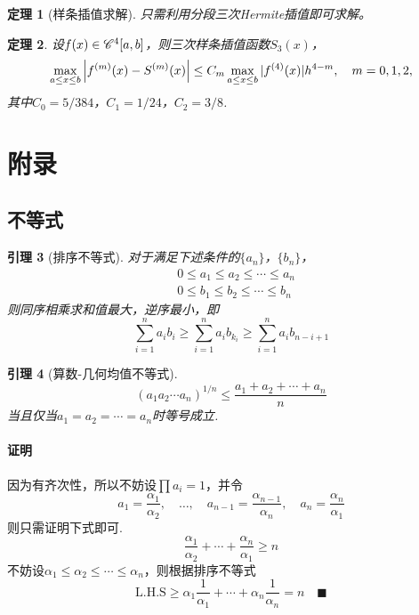 \documentclass[12pt, a4paper]{article}
\theoremstyle{margin}
\newtheorem{thm}{定理}
\newtheorem{lemma}[thm]{引理}
\newcommand{\ms}{\mathscr}
\newcommand{\f}{\mathnormal{f}}
\newcommand{\lhs}{\text{L.H.S}}
\newcommand{\proof}{\paragraph{证明}}
\begin{document}
  \begin{thm}[样条插值求解]
    只需利用分段三次Hermite插值即可求解。
  \end{thm}

  \begin{thm}
    设$\f(x)\in\ms{C}^4[a, b]$，则三次样条插值函数$S_3(x)$，
    \[
      \max_{a\le x\le b}\left| \f^{(m)}(x) - S^{(m)}(x) \right|
      \le C_m \max_{a\le x\le b}|\f^{(4)}(x)|h^{4-m},\quad
      m=0,1,2,
    \]
    其中$C_0 = 5/384$，$C_1 = 1/24$，$C_2 = 3/8$.
  \end{thm}


\newpage
\section{附录}
\subsection{不等式}

  \begin{lemma}[排序不等式]
    \label{lemma: 排序不等式}
    对于满足下述条件的$\{a_n\}$，$\{b_n\}$，
    \[\begin{split}
      & 0 \le a_1\le a_2\le\cdots\le a_n \\
      & 0 \le b_1\le b_2\le\cdots\le b_n
    \end{split}\]
    则同序相乘求和值最大，逆序最小，即
    \[
      \sum_{i=1}^n a_ib_i \ge \sum_{i=1}^n a_ib_{k_i}
      \ge \sum_{i=1}^n a_ib_{n-i+1}
    \]
  \end{lemma}

  \begin{lemma}[算数-几何均值不等式]
    \[
      (a_1a_2\cdots a_n)^{1/n} \le \frac{a_1+a_2+\cdots+a_n}{n}
    \]
    当且仅当$a_1 = a_2 = \cdots = a_n$时等号成立.
  \end{lemma}
  \proof
    因为有齐次性，所以不妨设$\prod a_i=1$，并令
    \[
      a_1=\frac{\alpha_1}{\alpha_2},\quad
      \dots,\quad
      a_{n-1} = \frac{\alpha_{n-1}}{\alpha_n},\quad
      a_n = \frac{\alpha_n}{\alpha_1}
    \]
    则只需证明下式即可.
    \[
      \frac{\alpha_1}{\alpha_2} + \cdots + \frac{\alpha_n}{\alpha_1}
      \ge n
    \]
    不妨设$\alpha_1 \le \alpha_2 \le \cdots \le \alpha_n$，则根据排序不等式
    \[
      \lhs \ge \alpha_1\frac{1}{\alpha_1} + \cdots + \alpha_n\frac{1}{\alpha_n}
       = n \quad\blacksquare
    \]
\end{document}
